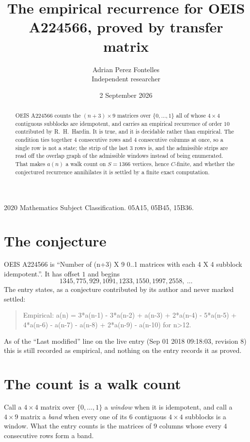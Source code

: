 \documentclass[11pt,a4paper]{article}
\title{The empirical recurrence for OEIS A224566, proved by transfer matrix}
\author{Adrian Perez Fontelles\\ \small Independent researcher}
\date{2 September 2026}
\theoremstyle{plain}
\theoremstyle{definition}
\begin{document}
\maketitle

\begin{abstract}
OEIS A224566 counts the $(n+3)\times9$ matrices over $\{0,\dots,1\}$ all of whose
$4\times4$ contiguous subblocks are idempotent, and carries an empirical recurrence of order
$10$ contributed by R.~H.~Hardin. It is true, and it is decidable rather than empirical.
The condition ties together $4$ consecutive rows and $4$ consecutive columns at once, so a
single row is not a state; the strip of the last $3$ rows is, and the admissible strips
are read off the overlap graph of the admissible windows instead of being enumerated. That
makes $a(n)$ a walk count on $S=1366$ vertices, hence $C$-finite, and whether the conjectured
recurrence annihilates it is settled by a finite exact computation.
\end{abstract}

\noindent\small 2020 Mathematics Subject Classification. 05A15, 05B45, 15B36.\normalsize

\section{The conjecture}

OEIS A224566 is ``Number of (n+3) X 9 0..1 matrices with each 4 X 4 subblock idempotent.''. It has offset $1$ and begins
\[
1345, 775, 929, 1091, 1233, 1550, 1997, 2558,\ \dots
\]
The entry states, as a conjecture contributed by its author and never marked settled:
\begin{quote}
Empirical: a(n) = 3*a(n-1) - 3*a(n-2) + a(n-3) + 2*a(n-4) - 5*a(n-5) + 4*a(n-6) - a(n-7) - a(n-8) + 2*a(n-9) - a(n-10) for n>12.
\end{quote}
As of the ``Last modified'' line on the live entry (Sep 01 2018 09:18:03, revision 8) this is still
recorded as empirical, and nothing on the entry records it as proved.

\section{The count is a walk count}

Call a $4\times4$ matrix over $\{0,\dots,1\}$ a \emph{window} when it is idempotent, and
call a $4\times9$ matrix a \emph{band} when every one of its $6$ contiguous
$4\times4$ subblocks is a window. What the entry counts is the matrices of $9$ columns
whose every $4$ consecutive rows form a band.
\end{document}

